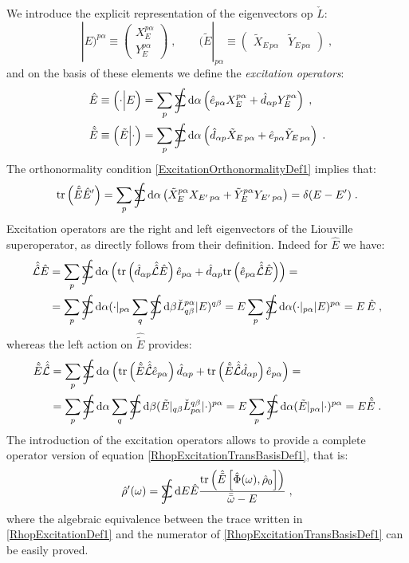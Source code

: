 \documentclass[a4paper]{article}
\newcommand{\dd}{{\rm d}}
\newcommand{\bbomega}{{\bar{\bar\omega}}}
\newcommand{\sint}{\mathrlap{\displaystyle\int}
\mathrlap{\textstyle\sum}
\phantom{\mathrlap{\displaystyle
\int}\textstyle\sum}}
\newcommand{\be}{\begin{equation}}
\newcommand{\ee}{\end{equation}}
\newcommand{\nn}{\notag}
\newcommand{\qq}{\qquad}
\newcommand{\lb}{\label}
\newcommand{\mat}[1]{\begin{pmatrix} #1\end{pmatrix}}
\newcommand{\op}[1]{\hat {#1}}
\newcommand{\sop}[1]{\op{\op {#1}}}
\newcommand{\commutator}[2]{\left[ {#1} , {#2} \right]}
\newcommand{\trace}[1]{\mathrm{tr}\left(#1\right)}
\newcommand{\optr}[1]{\check #1}
\newcommand{\sket}[2]{| #2)^{#1}}
\newcommand{\sbra}[2]{( #2|_{#1}}
\newcommand{\dbraket}[2]{\Bigl(#1 \Bigl| #2 \Bigr)}
\newcommand{\dmnot}{\op{\rho}_0}
\newcommand{\dm}{\op{\rho}}
\newcommand{\excite}[2]{\op e_{{#1}{#2}}}
\newcommand{\decay}[2]{\op d_{{#1}{#2}}}
\newcommand{\Liouv}{\sop{\mathcal L}}
\begin{document}
We introduce the explicit representation of the eigenvectors op $\optr{L}$:
\be\lb{XYcoeffDef1}
\sket{p\alpha}{E} \equiv \mat{X_E^{p\alpha} \\ Y_E^{p\alpha}} \;, \qq
\sbra{p\alpha}{\tilde E} \equiv \mat{\tilde X_{E\,p\alpha} & \tilde Y_{E\,p\alpha}} \;,
\ee
and on the basis of these elements we define the \emph{excitation operators}:
\begin{align}\lb{ExctitationOperatorsDef1}
\op E &\equiv \dbraket{\cdot}{E} = 
\sum_p \sint \dd \alpha \left(\excite{p}{\alpha} X_E^{p\alpha} + \decay{\alpha}{p} Y_E^{p\alpha}\right) 
\;,\nn \\
\op{\tilde E} &\equiv \dbraket{\tilde E}{\cdot} = \sum_p \sint \dd \alpha \left(\decay{\alpha}{p} \tilde X_{E\,p\alpha} + 
\excite{p}{\alpha}\tilde Y_{E\,p\alpha}  \right)\;.
\end{align}
The orthonormality condition \eqref{ExcitationOrthonormalityDef1} implies that:
\be
\trace{\op{\tilde E} \op E'} = \sum_p\sint \dd\alpha \left(\tilde X_E^{p\alpha} X_{E'\,p\alpha} +
\tilde Y_E^{p\alpha} Y_{E'\,p\alpha}\right) = \delta(E-E') \;. 
\ee
Excitation operators are the right and left eigenvectors of the Liouville superoperator, as directly follows from their
definition. Indeed for $\op E$ we have:
\begin{align}\lb{opEeigenvalueDef1}
\Liouv \op E & = \sum_p \sint \dd \alpha \left(\trace{\decay{\alpha}{p} \Liouv \op E} \excite{p}{\alpha} + 
\decay{\alpha}{p} \trace{ \excite{p}{\alpha} \Liouv \op E}  \right) = \nn \\
&= \sum_p \sint  \dd \alpha \sbra{p\alpha}{\cdot} \sum_q \sint  \dd \beta \optr{L}^{p \alpha}_{q\beta} \sket{q\beta}{E} 
= E \sum_p \sint \dd \alpha \sbra{p\alpha}{\cdot} \sket{p\alpha}{E} = E \, \op E \;,	
\end{align}
whereas the left action on $\op{\tilde E}$ provides:
\begin{align}\lb{optildeEeigenvalueDef1}
 \op{\tilde E} \Liouv &=  \sum_p \sint \dd \alpha \left(
\trace{\op{\tilde E}\Liouv\excite{p}{\alpha}}\decay{\alpha}{p} +  
\trace{\op{\tilde E}\sop{\mathcal L}\decay{\alpha}{p}} \excite{p}{\alpha} \right) = 
\nn \\ &= \sum_p \sint  \dd \alpha  \sum_q \sint  \dd \beta
\sbra{q\beta}{\tilde E}\optr{L}^{q\beta}_{p\alpha}\sket{p\alpha}{\cdot} = 
E\sum_p \sint \dd \alpha \sbra{p\alpha}{\tilde E} \sket{p\alpha}{\cdot}  =
E \op{\tilde E} \;.
\end{align}
The introduction of the excitation operators allows to provide a complete operator version of equation \eqref{RhopExcitationTransBasisDef1}, that is:
\be\lb{RhopExcitationDef1}
\dm'(\omega) = 
\sint\dd E \op E
\frac{\trace{\op{\tilde E}\commutator{\op\Phi(\omega)}{\dmnot}}}{\bbomega-E} \;,
\ee
where the algebraic equivalence between the trace written in \eqref{RhopExcitationDef1} and the numerator of \eqref{RhopExcitationTransBasisDef1}
can be easily proved.
\end{document}
